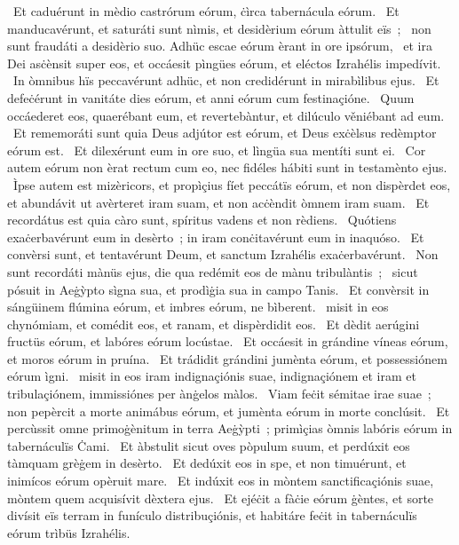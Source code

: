 ~Et caduérunt in mèdio castrórum eórum, ċìrca tabernácula eórum. 
~Et manducavérunt, et saturáti sunt nìmis, et desidèrium eórum àttulit eïs~; 
~non sunt fraudáti a desidèrio suo. Adhüc escae eórum èrant in ore ipsórum, 
~et ira Dei asċènsit super eos, et occáesit pìngües eórum, et eléctos Izrahélis impedívit. 
~In òmnibus hïs peccavérunt adhüc, et non credidérunt in mirabìlibus ejus. 
~Et defeċérunt in vanitáte dies eórum, et anni eórum cum festinaçióne. 
~Quum occáederet eos, quaerébant eum, et revertebàntur, et dilúculo věniébant ad eum. 
~Et rememoráti sunt quia Deus adjútor est eórum, et Deus exċèlsus redèmptor eórum est. 
~Et dilexérunt eum in ore suo, et lìngüa sua mentíti sunt ei. 
~Cor autem eórum non èrat rectum cum eo, nec fidéles hábiti sunt in testamènto ejus. 
~Ìpse autem est mizèricors, et propìçius fíet peccátïs eórum, et non dispèrdet eos, et abundávit ut avèrteret iram suam, et non acċèndit òmnem iram suam. 
~Et recordátus est quia càro sunt, spíritus vadens et non rèdiens. 
~Quótiens exaċerbavérunt eum in desèrto~; in iram conċitavérunt eum in inaquóso. 
~Et convèrsi sunt, et tentavérunt Deum, et sanctum Izrahélis exaċerbavérunt. 
~Non sunt recordáti mànüs ejus, die qua redémit eos de mànu tribulàntis~; 
~sicut pósuit in Aeġỳpto sìgna sua, et prodìġia sua in campo Tanis. 
~Et convèrsit in sángüinem flúmina eórum, et imbres eórum, ne bìberent. 
~misit in eos chynómiam, et comédit eos, et ranam, et dispèrdidit eos. 
~Et dèdit aerúgini fructüs eórum, et labóres eórum locústae. 
~Et occáesit in grándine víneas eórum, et moros eórum in pruína. 
~Et trádidit grándini jumènta eórum, et possessiónem eórum ìgni. 
~misit in eos iram indignaçiónis suae, indignaçiónem et iram et tribulaçiónem, immissiónes per ànġelos màlos. 
~Viam feċit sémitae irae suae~; non pepèrcit a morte animábus eórum, et jumènta eórum in morte conclúsit. 
~Et percùssit omne primoġènitum in terra Aeġỳpti~; primìçias òmnis labóris eórum in tabernáculïs Ċami. 
~Et àbstulit sicut oves pòpulum suum, et perdúxit eos tàmquam grèġem in desèrto. 
~Et dedúxit eos in spe, et non timuérunt, et inimícos eórum opèruit mare. 
~Et indúxit eos in mòntem sanctificaçiónis suae, mòntem quem acquisívit dèxtera ejus. 
~Et ejéċit a fàċie eórum ġèntes, et sorte divísit eïs terram in funículo distribuçiónis, et habitáre feċit in tabernáculïs eórum trìbüs Izrahélis. 
